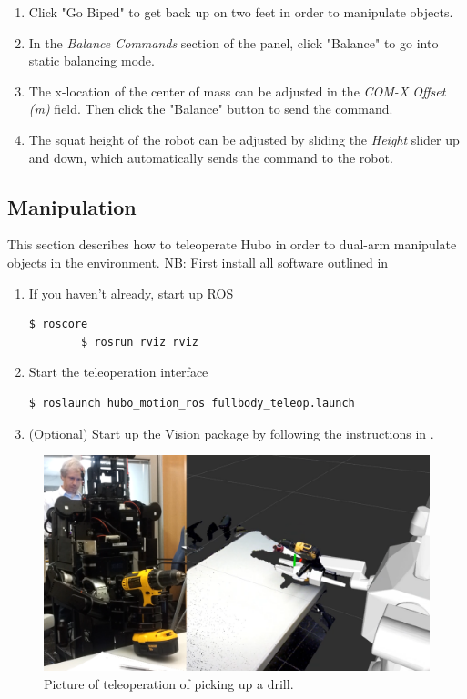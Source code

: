 \documentclass[letterpaper, 10 pt]{report}
\begin{document}
\begin{enumerate}
    \item Click "Go Biped" to get back up on two feet in order to manipulate objects.
    \item In the \textit{Balance Commands} section of the panel, click "Balance" to go into static balancing mode.
    \item The x-location of the center of mass can be adjusted in the \textit{COM-X Offset (m)} field. Then click the "Balance" button to send the command.
    \item The squat height of the robot can be adjusted by sliding the \textit{Height} slider up and down, which automatically sends the command to the robot.
  \end{enumerate}

\subsection{Manipulation}
This section describes how to teleoperate Hubo in order to dual-arm manipulate objects in the environment.
NB: First install all software outlined in 
\begin{enumerate}
  \item If you haven't already, start up ROS
    \begin{lstlisting}[language=bash]
  		$ roscore
  		$ rosrun rviz rviz
	\end{lstlisting}
  \item Start the teleoperation interface
    \begin{lstlisting}[language=bash]
  		$ roslaunch hubo_motion_ros fullbody_teleop.launch
	\end{lstlisting}
  \item (Optional) Start up the Vision package by following the instructions in .
\end{enumerate}
  \begin{figure}[ht]
    \centering
    \includegraphics[width=12.0cm]{figures/pickup-drill-rviz}
    \caption{Picture of teleoperation of picking up a drill.}
    \label{fig:pickup-drill-rviz-image}
  \end{figure}
\end{document}
